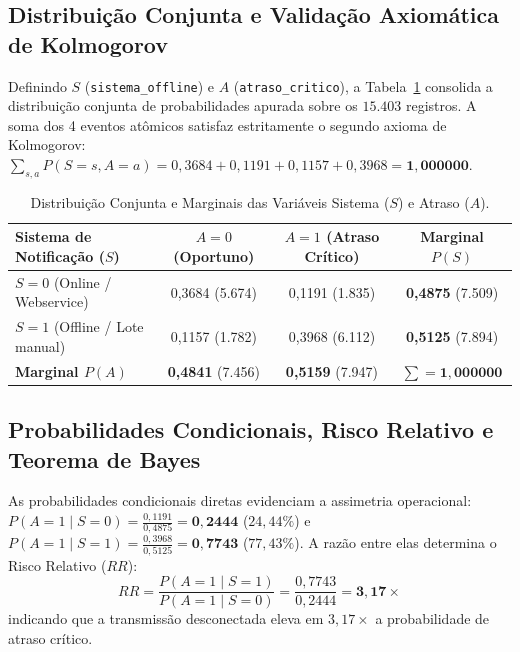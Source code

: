 \documentclass[12pt]{article}
\begin{document}
\subsection{Distribuição Conjunta e Validação Axiomática de Kolmogorov}

Definindo $S$ (\texttt{sistema\_offline}) e $A$ (\texttt{atraso\_critico}), a Tabela~\ref{tab:conjunta} consolida a distribuição conjunta de probabilidades apurada sobre os $15.403$ registros. A soma dos 4 eventos atômicos satisfaz estritamente o segundo axioma de Kolmogorov: $\sum_{s, a} P(S=s, A=a) = 0,3684 + 0,1191 + 0,1157 + 0,3968 = \mathbf{1,000000}$.

\begin{table}[htbp]
\centering
\footnotesize
\caption{Distribuição Conjunta e Marginais das Variáveis Sistema ($S$) e Atraso ($A$).}
\label{tab:conjunta}
\begin{tabular}{lccc}
\toprule
\textbf{Sistema de Notificação ($S$)} & \textbf{$A = 0$ (Oportuno)} & \textbf{$A = 1$ (Atraso Crítico)} & \textbf{Marginal $P(S)$} \\
\midrule
$S = 0$ (Online / Webservice) & 0,3684 (5.674) & 0,1191 (1.835) & \textbf{0,4875} (7.509) \\
$S = 1$ (Offline / Lote manual) & 0,1157 (1.782) & 0,3968 (6.112) & \textbf{0,5125} (7.894) \\
\midrule
\textbf{Marginal $P(A)$} & \textbf{0,4841} (7.456) & \textbf{0,5159} (7.947) & $\sum = \mathbf{1,000000}$ \\
\bottomrule
\end{tabular}
\end{table}

\subsection{Probabilidades Condicionais, Risco Relativo e Teorema de Bayes}

As probabilidades condicionais diretas evidenciam a assimetria operacional: $P(A=1 \mid S=0) = \frac{0,1191}{0,4875} = \mathbf{0,2444}$ ($24,44\%$) e $P(A=1 \mid S=1) = \frac{0,3968}{0,5125} = \mathbf{0,7743}$ ($77,43\%$). A razão entre elas determina o Risco Relativo ($RR$):
\begin{equation}
RR = \frac{P(A=1 \mid S=1)}{P(A=1 \mid S=0)} = \frac{0,7743}{0,2444} = \mathbf{3,17\times}
\end{equation}
indicando que a transmissão desconectada eleva em $3,17\times$ a probabilidade de atraso crítico.
\end{document}
